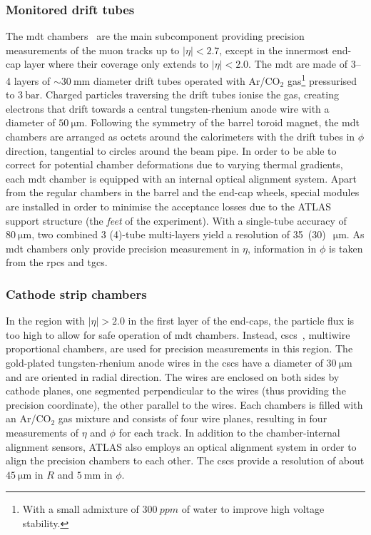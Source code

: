 \subsubsection{Monitored drift tubes}

The \gls{mdt} chambers~\cite{Aad:2008zzm} are the main subcomponent providing precision measurements of the muon tracks up to $\vert\eta\vert <2.7$, except in the innermost end-cap layer where their coverage only extends to $\vert\eta\vert <2.0$. The \gls{mdt} are made of 3--4 layers of $\sim \SI{30}{\milli\meter}$ diameter drift tubes operated with Ar/CO$_2$ gas\footnote{With a small admixture of $\SI{300}{ppm}$ of water to improve high voltage stability.} pressurised to $\SI{3}{\bar}$. Charged particles traversing the drift tubes ionise the gas, creating electrons that drift towards a central tungsten-rhenium anode wire with a diameter of $\SI{50}{\micro\meter}$. Following the symmetry of the barrel toroid magnet, the \gls{mdt} chambers are arranged as octets around the calorimeters with the drift tubes in $\phi$ direction, \ie tangential to circles around the beam pipe. In order to be able to correct for potential chamber deformations due to varying thermal gradients, each \gls{mdt} chamber is equipped with an internal optical alignment system. Apart from the regular chambers in the barrel and the end-cap wheels, special modules are installed in order to minimise the acceptance losses due to the ATLAS support structure (the \textit{feet} of the experiment). With a single-tube accuracy of $\SI{80}{\micro\meter}$, two combined 3 (4)-tube multi-layers yield a resolution of 35~(30)~$\SI{}{\micro\meter}$. As \gls{mdt} chambers only provide precision measurement in $\eta$, information in $\phi$ is taken from the \glspl{rpc} and \glspl{tgc}.

\subsubsection{Cathode strip chambers}

In the region with $\vert\eta\vert > 2.0$ in the first layer of the end-caps, the particle flux is too high to allow for safe operation of \gls{mdt} chambers. Instead, \glspl{csc}~\cite{Aad:2008zzm}, multiwire proportional chambers, are used for precision measurements in this region. The gold-plated tungsten-rhenium anode wires in the \glspl{csc} have a diameter of $\SI{30}{\micro\meter}$ and are oriented in radial direction. The wires are enclosed on both sides by cathode planes, one segmented perpendicular to the wires (thus providing the precision coordinate), the other parallel to the wires. Each chambers is filled with an Ar/CO$_2$ gas mixture and consists of four wire planes, resulting in four measurements of $\eta$ and $\phi$ for each track. In addition to the chamber-internal alignment sensors, ATLAS also employs an optical alignment system in order to align the precision chambers to each other. The \glspl{csc} provide a resolution of about $\SI{45}{\micro\meter}$ in $R$ and $\SI{5}{\milli\meter}$ in $\phi$.

